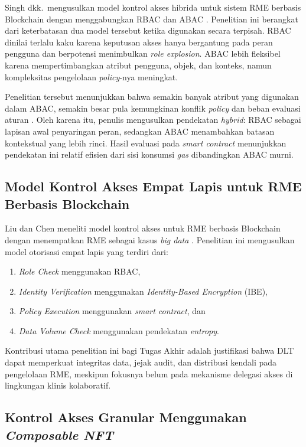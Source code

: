 \documentclass[bahasa, 12pt, a4paper, onecolumn, oneside, final]{report}
\begin{document}
Singh dkk.\ mengusulkan model kontrol akses hibrida untuk sistem RME berbasis Blockchain dengan menggabungkan RBAC dan ABAC \autocite{singh2025granular}. Penelitian ini berangkat dari keterbatasan dua model tersebut ketika digunakan secara terpisah. RBAC dinilai terlalu kaku karena keputusan akses hanya bergantung pada peran pengguna dan berpotensi menimbulkan \textit{role explosion}. ABAC lebih fleksibel karena mempertimbangkan atribut pengguna, objek, dan konteks, namun kompleksitas pengelolaan \textit{policy}-nya meningkat.

Penelitian tersebut menunjukkan bahwa semakin banyak atribut yang digunakan dalam ABAC, semakin besar pula kemungkinan konflik \textit{policy} dan beban evaluasi aturan \autocite{singh2025granular}. Oleh karena itu, penulis mengusulkan pendekatan \textit{hybrid}: RBAC sebagai lapisan awal penyaringan peran, sedangkan ABAC menambahkan batasan kontekstual yang lebih rinci. Hasil evaluasi pada \textit{smart contract} menunjukkan pendekatan ini relatif efisien dari sisi konsumsi \textit{gas} dibandingkan ABAC murni.

\subsection{Model Kontrol Akses Empat Lapis untuk RME Berbasis Blockchain}
\label{subsec:empat-lapis-emr}

Liu dan Chen meneliti model kontrol akses untuk RME berbasis Blockchain dengan menempatkan RME sebagai kasus \textit{big data} \autocite{liu2025accesscontrol}. Penelitian ini mengusulkan model otorisasi empat lapis yang terdiri dari:
\begin{enumerate}
	\item \textit{Role Check} menggunakan RBAC,
	\item \textit{Identity Verification} menggunakan \textit{Identity-Based Encryption} (IBE),
	\item \textit{Policy Execution} menggunakan \textit{smart contract}, dan
	\item \textit{Data Volume Check} menggunakan pendekatan \textit{entropy}.
\end{enumerate}

Kontribusi utama penelitian ini bagi Tugas Akhir adalah justifikasi bahwa DLT dapat memperkuat integritas data, jejak audit, dan distribusi kendali pada pengelolaan RME, meskipun fokusnya belum pada mekanisme delegasi akses di lingkungan klinis kolaboratif.

\subsection{Kontrol Akses Granular Menggunakan \textit{Composable NFT}}
\label{subsec:composable-nft-rme}
\end{document}
